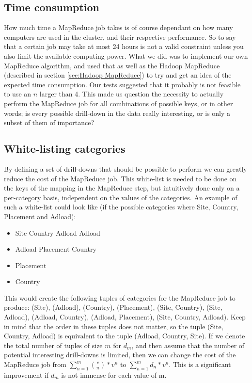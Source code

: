 \subsection{Time consumption}
How much time a MapReduce job takes is of course dependant on how many computers are used in the cluster, and their respective performance. So to say that a certain job may take at most 24 hours is not a valid constraint unless you also limit the available computing power. What we did was to implement our own MapReduce algorithm, and used that as well as the Hadoop MapReduce (described in section \ref{sec:Hadoop MapReduce}) to try and get an idea of the expected time consumption. Our tests suggested that it probably is not feasible to use an $n$ larger than 4. This made us question the necessity to actually perform the MapReduce job for all combinations of possible keys, or in other words; is every possible drill-down in the data really interesting, or is only a subset of them of importance?

\subsection{White-listing categories}
By defining a set of drill-downs that should be possible to perform we can greatly reduce the cost of the MapReduce job. This white-list is needed to be done on the keys of the mapping in the MapReduce step, but intuitively done only on a per-category basis, independent on the values of the categories. An example of such a white-list could look like (if the possible categories where Site, Country, Placement and Adload):
\begin{itemize}
\item Site
\subitem Country
\subsubitem Adload
\subitem Adload
\item Adload
\subitem Placement
\subitem Country
\item Placement
\item Country
\end{itemize}

This would create the following tuples of categories for the MapReduce job to produce: (Site), (Adload), (Country), (Placement), (Site, Country), (Site, Adload), (Adload, Country), (Adload, Placement), (Site, Country, Adload). Keep in mind that the order in these tuples does not matter, so the tuple (Site, Country, Adload) is equivalent to the tuple (Adload, Country, Site). If we denote the total number of tuples of size $m$ for $d_m$, and then assume that the number of potential interesting drill-downs is limited, then we can change the cost of the MapReduce job from $\displaystyle\sum\limits_{n=1}^m {c\choose n} * v^n$ to $\displaystyle\sum\limits_{n=1}^m d_n * v^n$. This is a significant improvement if $d_m$ is not immense for each value of m.

